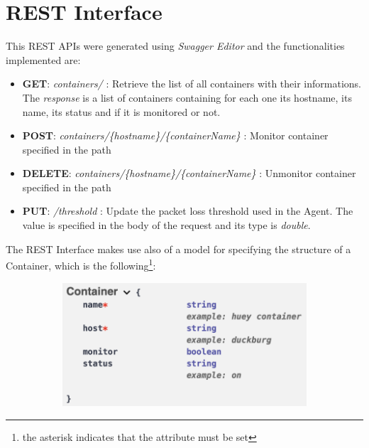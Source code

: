 \section{REST Interface}
This REST APIs were generated using \textit{Swagger Editor} and the functionalities implemented are:

\begin{itemize}
	\item \textbf{GET}:
		\subitem \textit{containers/} : Retrieve the list of all containers with their informations. The \textit{response} is a list of containers containing for each one its hostname, its name, its status and if it is monitored or not.
	\item \textbf{POST}:
		\subitem \textit{containers/\{hostname\}/\{containerName\}} : Monitor container specified in the path
	\item \textbf{DELETE}:
		\subitem \textit{containers/\{hostname\}/\{containerName\}} : Unmonitor container specified in the path
	\item \textbf{PUT}:
		\subitem \textit{/threshold} : Update the packet loss threshold used in the Agent. The value is specified in the body of the request and its type is \textit{double}.
\end{itemize}

The REST Interface makes use also of a model for specifying the structure of a Container, which is the following\footnote{the asterisk indicates that the attribute must be set}:

\begin{figure}[H]
	\begin{subfigure}{\textwidth}
	\centering
		\includegraphics[width=0.9\linewidth]{img/container.png} 
	\end{subfigure}
\end{figure}